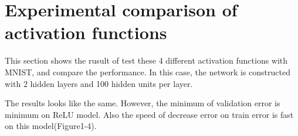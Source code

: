 \documentclass{article}
\DeclareMathOperator{\relu}{relu}
\DeclareMathOperator{\lrelu}{lrelu}
\DeclareMathOperator{\elu}{elu}
\DeclareMathOperator{\selu}{selu}
\begin{document}
%
%


\section{Experimental comparison of activation functions}
\label{sec:actexpts}
This section shows the rusult of test these 4 different activation functions with MNIST, and compare the performance. In this case, the network is constructed with 2 hidden layers and 100 hidden units per layer.

The results looks like the same. However, the minimum of validation error is minimum on ReLU model. Also the speed of decrease error on train error is fast on this model(Figure1-4).
\end{document}
